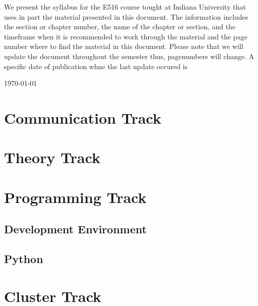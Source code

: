 We present the syllabus for the E516 course tought at Indiana University that 
uses in part the material presented in this document. The information includes the section or chapter number, the name of the chapter or section, and the timeframe  when it is recommended to work through the material and the page number where to find the material in this document. Please note that we will update the document throughout the semester thus, pagenumbers will change. A specific date of publication whne the last update occured is

\today~\currenttime 

\section{Communication Track}









\section{Theory Track}


\section{Programming Track}

\subsection{Development Environment}




\subsection{Python}






\section{Cluster Track}

